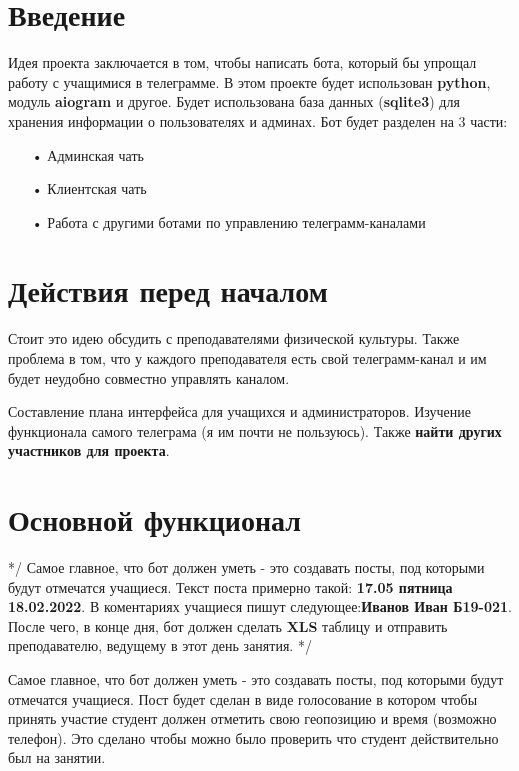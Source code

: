 



\newpage 

\tableofcontents

\newpage
\section{Введение}
 Идея проекта заключается в том, чтобы написать бота, который бы упрощал работу с учащимися в телеграмме. В этом проекте будет использован \textbf{python}, модуль \textbf{aiogram} и другое. Будет использована база данных (\textbf{sqlite3}) для хранения информации о пользователях и админах.  Бот будет разделен на 3 части:
 \begin{enumerate}
 \item[•] Админская чать
 \item[•] Клиентская чать
 \item[•] Работа с другими ботами по управлению телеграмм-каналами
 \end{enumerate}
 \section{Действия перед началом}
 Стоит это идею обсудить с преподавателями физической культуры. Также проблема в том, что у каждого преподавателя есть свой телеграмм-канал и им будет неудобно совместно управлять каналом.
 
  Составление плана интерфейса для учащихся и администраторов. Изучение функционала самого телеграма (я им почти не пользуюсь). Также \textbf{найти других участников для проекта}.
  \section{Основной функционал}
*/ Самое главное, что бот должен уметь - это создавать посты, под которыми будут отмечатся учащиеся. Текст поста примерно такой:  \textbf{17.05 пятница 18.02.2022}. В коментариях учащиеся пишут следующее:\textbf{Иванов Иван Б19-021}. После чего, в конце дня, бот должен сделать \textbf{XLS} таблицу и отправить преподавателю, ведущему в этот день занятия.  */

	Самое главное, что бот должен уметь - это создавать посты, под которыми будут отмечатся учащиеся. Пост будет сделан в виде голосование в котором чтобы принять участие студент должен отметить свою геопозицию и время (возможно телефон). Это сделано чтобы можно было проверить что студент действительно был на занятии.
	
